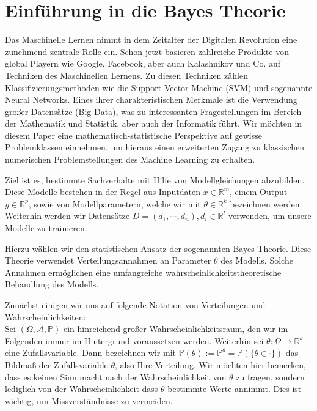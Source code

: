 \thispagestyle{plain}
\section{Einführung in die Bayes Theorie}

Das Maschinelle Lernen nimmt in dem Zeitalter der Digitalen Revolution eine zunehmend zentrale Rolle ein. Schon jetzt basieren zahlreiche Produkte von global Playern wie Google, Facebook, aber auch Kalashnikov und Co. auf Techniken des Maschinellen Lernens. Zu diesen Techniken zählen Klassifizierungsmethoden wie die Support Vector Machine (SVM) und sogenannte Neural Networks. Eines ihrer charakteristischen Merkmale ist die Verwendung großer Datensätze (Big Data), was zu interessanten Fragestellungen im Bereich der Mathematik und Statistik, aber auch der Informatik führt. Wir möchten in diesem Paper eine mathematisch-statistische Perspektive auf gewisse Problemklassen einnehmen, um hieraus einen erweiterten Zugang zu klassischen numerischen Problemstellungen des Machine Learning zu erhalten.


Ziel ist es, bestimmte Sachverhalte mit Hilfe von Modellgleichungen abzubilden. Diese Modelle bestehen in der Regel aus Inputdaten $x \in \mathbb{R}^m$, einem Output $y \in \mathbb{R}^p$, sowie von Modellparametern, welche wir mit $\theta \in \mathbb{R}^k$ bezeichnen werden. Weiterhin werden wir Datensätze $D = (d_1, \cdots, d_n), d_i \in \mathbb{R}^l$ verwenden, um unsere Modelle zu trainieren. 


Hierzu wählen wir den statistischen Ansatz der sogenannten Bayes Theorie. Diese Theorie verwendet Verteilungsannahmen an Parameter $\theta$ des Modells. Solche Annahmen ermöglichen eine umfangreiche wahrscheinlichkeitstheoretische Behandlung des Modells.

Zunächst einigen wir uns auf folgende Notation von Verteilungen und Wahrscheinlichkeiten: \\
Sei $(\Omega, \mathcal{A}, \mathbb{P})$ ein hinreichend großer Wahrscheinlichkeitsraum, den wir im Folgenden immer im Hintergrund voraussetzen werden. Weiterhin sei $\theta: \Omega \rightarrow \mathbb{R}^k$ eine Zufallsvariable. Dann bezeichnen wir mit
$\mathbb{P}(\theta) := \mathbb{P}^\theta = \mathbb{P}(\{ \theta \in \cdot \})$
das Bildmaß der Zufallsvariable $\theta$, also Ihre Verteilung.
Wir möchten hier bemerken, dass es keinen Sinn macht nach der Wahrscheinlichkeit von $\theta$ zu fragen, sondern lediglich von der Wahrscheinlichkeit dass $\theta$ bestimmte Werte annimmt. Dies ist wichtig, um Missverständnisse zu vermeiden.

